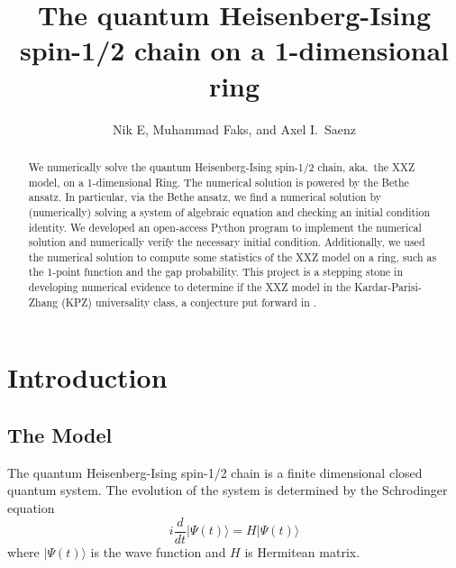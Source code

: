\documentclass[11pt]{article}
\numberwithin{equation}{section}
\theoremstyle{plain}
\theoremstyle{plain}
\theoremstyle{definition}
\begin{document}
\title{\vspace{-8ex} The quantum Heisenberg-Ising spin-1/2 chain on a 1-dimensional ring}

\author{Nik E, Muhammad Faks, and Axel I.~Saenz}


\date{}

\maketitle

\begin{abstract}
  We numerically solve the quantum Heisenberg-Ising spin-1/2 chain, aka.~the XXZ model, on a 1-dimensional Ring. The numerical solution is powered by the Bethe ansatz. In particular, via the Bethe ansatz, we find a numerical solution by (numerically) solving a system of algebraic equation and checking an initial condition identity. We developed an open-access Python program to implement the numerical solution and numerically verify the necessary initial condition. Additionally, we used the numerical solution to compute some statistics of the XXZ model on a ring, such as the 1-point function and the gap probability. This project is a stepping stone in developing numerical evidence to determine if the XXZ model in the Kardar-Parisi-Zhang (KPZ) universality class, a conjecture put forward in \cite{STW22}.
\end{abstract}






\section{Introduction}

\subsection{The Model}

The quantum Heisenberg-Ising spin-1/2 chain is a finite dimensional closed quantum system. The evolution of the system is determined by the Schrodinger equation
\begin{equation}
    i\frac{d}{dt} | \Psi (t) \rangle = H  | \Psi (t) \rangle
\end{equation}
where $| \Psi (t) \rangle$ is the wave function and $H$ is Hermitean matrix.
\end{document}
